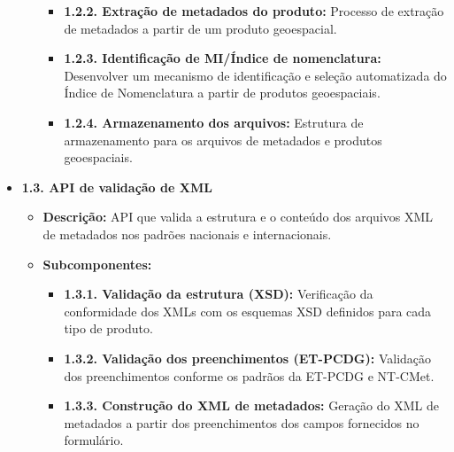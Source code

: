 \begin{itemize}
\begin{itemize}
\begin{itemize}
            \item \textbf{1.2.2. Extração de metadados do produto:} Processo de extração de metadados a partir de um produto geoespacial.
            
            \item \textbf{1.2.3. Identificação de MI/Índice de nomenclatura:} Desenvolver um mecanismo de identificação e seleção automatizada do Índice de Nomenclatura a partir de produtos geoespaciais.
            
            \item \textbf{1.2.4. Armazenamento dos arquivos:} Estrutura de armazenamento para os arquivos de metadados e produtos geoespaciais.
        \end{itemize}
    \end{itemize}

    \item \textbf{1.3. API de validação de XML}
    \begin{itemize}
        \item \textbf{Descrição:} API que valida a estrutura e o conteúdo dos arquivos XML de metadados nos padrões nacionais e internacionais.
        \item \textbf{Subcomponentes:}
        \begin{itemize}
            \item \textbf{1.3.1. Validação da estrutura (XSD):} Verificação da conformidade dos XMLs com os esquemas XSD definidos para cada tipo de produto.
            \item \textbf{1.3.2. Validação dos preenchimentos (ET-PCDG):} Validação dos preenchimentos conforme os padrãos da ET-PCDG e NT-CMet.
            \item \textbf{1.3.3. Construção do XML de metadados:} Geração do XML de metadados a partir dos preenchimentos dos campos fornecidos no formulário.
        \end{itemize}
    \end{itemize}


\end{itemize}
